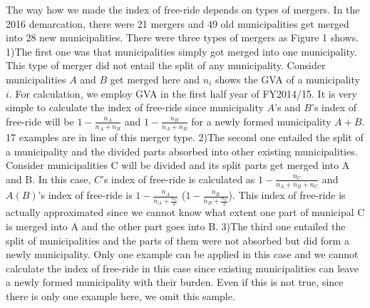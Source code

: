\documentclass[dvipdfmx]{jsarticle}
\begin{document}
\quad The way how we made the index of free-ride depends on types of mergers. In the 2016 demarcation, there were 21 mergers and 49 old municipalities get merged into 28 new municipalities. There were three types of mergers as Figure 1 shows. 1)The first one was that municipalities simply got merged into one municipality. This type of merger did not entail the split of any municipality. Consider municipalities $A$ and $B$ get merged here and $n_i$ shows the GVA of a municipality $i$. For calculation, we employ GVA in the first half year of FY2014/15. It is very simple to calculate the index of free-ride since municipality $A$’s and $B$'s index of free-ride will be $1-\frac{n_A}{n_{A}+n_{B}}$ and $1-\frac{n_B}{n_{A}+n_{B}}$ for a newly formed municipality $A+B$. 17 examples are in line of this merger type. 2)The second one entailed the split of a municipality and the divided parts absorbed into other existing municipalities. Consider municipalities C will be divided and its split parts get merged into A and B. In this case, $C$'s index of free-ride is calculated as $1-\frac{n_{C}}{n_{A}+n_{B}+n_{C}}$ and $A (B)$'s index of free-ride is $1-\frac{n_{A}}{n_{A}+\frac{n_{C}}2}$ ($1-\frac{n_{B}}{n_{B}+\frac{n_{C}}2}$). This index of free-ride is actually approximated since we cannot know what extent one part of municipal C is merged into A and the other part goes into B. 3)The third one entailed the split of municipalities and the parts of them were not absorbed but did form a newly municipality. Only one example can be applied in this case and we cannot calculate the index of free-ride in this case since existing municipalities can leave a newly formed municipality with their burden. Even if this is not true, since there is only one example here, we omit this sample.\\
\end{document}
